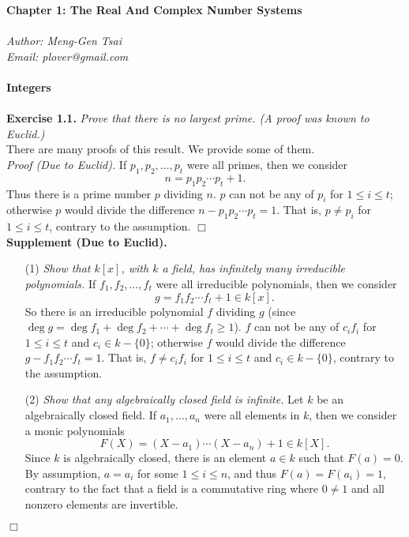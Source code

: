 \documentclass{article}
\begin{document}
\textbf{\Large Chapter 1: The Real And Complex Number Systems} \\\\



\emph{Author: Meng-Gen Tsai} \\
\emph{Email: plover@gmail.com} \\\\






\textbf{\large Integers} \\\\



\textbf{Exercise 1.1.}
\emph{Prove that there is no largest prime. (A proof was known to Euclid.)} \\

There are many proofs of this result. We provide some of them. \\

\emph{Proof (Due to Euclid).}
If
$p_1, p_2, \ldots, p_t$ were all primes, then
we consider $$n = p_1 p_2 \cdots p_t + 1.$$
Thus there is a prime number $p$ dividing $n$.
$p$ can not be any of $p_i$ for $1 \leq i \leq t$;
otherwise $p$ would divide the difference $n - p_1 p_2 \cdots p_t = 1$.
That is, $p \neq p_i$ for $1 \leq i \leq t$,
contrary to the assumption.
$\Box$ \\

\textbf{Supplement (Due to Euclid).}
\begin{enumerate}
\item[(1)]
  \emph{Show that $k[x]$, with $k$ a field,
  has infinitely many irreducible polynomials.}
  If
  $f_1, f_2, \ldots, f_t$ were all irreducible polynomials, then
  we consider $$g = f_1 f_2 \cdots f_t + 1 \in k[x].$$
  So there is an irreducible polynomial $f$ dividing $g$
  (since $\deg g = \deg f_1 + \deg f_2 + \cdots + \deg f_t \geq 1$).
  $f$ can not be any of $c_i f_i$ for $1 \leq i \leq t$ and $c_i \in k - \{0\}$;
  otherwise $f$ would divide the difference $g - f_1 f_2 \cdots f_t = 1$.
  That is, $f \neq c_i f_i$ for $1 \leq i \leq t$ and $c_i \in k - \{0\}$,
  contrary to the assumption.

\item[(2)]
  \emph{Show that any algebraically closed field is infinite.}
  Let $k$ be an algebraically closed field.
  If $a_1, \ldots, a_n$ were all elements in $k$, then
  we consider a monic polynomials
  \[
    F(X) = (X - a_1) \cdots (X - a_n) + 1 \in k[X].
  \]
  Since $k$ is algebraically closed,
  there is an element $a \in k$ such that $F(a) = 0$.
  By assumption, $a = a_i$ for some $1 \leq i \leq n$,
  and thus $F(a) = F(a_i) = 1$, contrary to the fact that
  a field is a commutative ring where $0 \neq 1$ and all nonzero elements are invertible.
\end{enumerate}
$\Box$ \\
\end{document}
